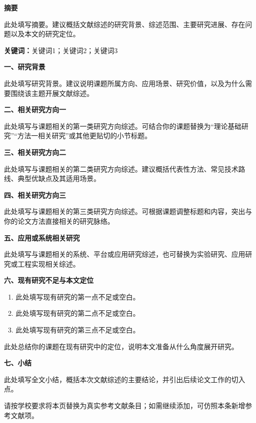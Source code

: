 \documentclass[12pt,a4paper]{ctexart}
\newcommand{\题目}{}
\newcommand{\姓名}{}
\newcommand{\学号}{}
\newcommand{\学院}{}
\newcommand{\专业}{}
\newcommand{\年级}{}
\newcommand{\校内指导教师}{}
\newcommand{\校外指导教师}{}
\newcommand{\日期年}{}
\newcommand{\日期月}{}
\newcommand{\日期日}{}
\newcommand{\摘要内容}{此处填写摘要。建议概括文献综述的研究背景、综述范围、主要研究进展、存在问题以及本文的研究定位。}
\newcommand{\关键词内容}{关键词1；关键词2；关键词3}
\newcommand{\研究背景内容}{此处填写研究背景。建议说明课题所属方向、应用场景、研究价值，以及为什么需要围绕该主题开展文献综述。}
\newcommand{\结构化处理内容}{此处填写与课题相关的第一类研究方向综述。可结合你的课题替换为“理论基础研究”“方法一相关研究”或其他更贴切的小节标题。}
\newcommand{\排序研究内容}{此处填写与课题相关的第二类研究方向综述。建议概括代表性方法、常见技术路线、典型优缺点及其适用场景。}
\newcommand{\图结构内容}{此处填写与课题相关的第三类研究方向综述。可根据课题调整标题和内容，突出与你的论文方法直接相关的研究脉络。}
\newcommand{\系统研究内容}{此处填写与课题相关的系统、平台或应用研究综述，也可替换为实验研究、应用研究或工程实现相关综述。}
\newcommand{\不足与定位条目一}{此处填写现有研究的第一点不足或空白。}
\newcommand{\不足与定位条目二}{此处填写现有研究的第二点不足或空白。}
\newcommand{\不足与定位条目三}{此处填写现有研究的第三点不足或空白。}
\newcommand{\不足与定位总结}{此处总结你的课题在现有研究中的定位，说明本文准备从什么角度展开研究。}
\newcommand{\小结内容}{此处填写全文小结，概括本次文献综述的主要结论，并引出后续论文工作的切入点。}
\newcommand{\封面字段}[3]{%
  \noindent\hspace*{2.05cm}\makebox[2.55cm][l]{\zihao{3}#1}%
  \FZUCenteredUnderline{#2}{#3}%
}
\begin{document}
\pagestyle{plain}
\setcounter{page}{1}

\begin{center}
  {\bfseries \题目}
\end{center}

\vspace{0.85cm}
\begin{center}
  {\bfseries 摘要}
\end{center}

\vspace{0.55cm}
\摘要内容\par

\vspace{0.85cm}
{\bfseries 关键词：}\关键词内容\par

\clearpage

{\bfseries 一、研究背景}\par
{}\研究背景内容\par

\vspace{0.35cm}
{\bfseries 二、相关研究方向一}\par
{}\结构化处理内容\par

\vspace{0.35cm}
{\bfseries 三、相关研究方向二}\par
{}\排序研究内容\par

\vspace{0.35cm}
{\bfseries 四、相关研究方向三}\par
{}\图结构内容\par

\vspace{0.35cm}
{\bfseries 五、应用或系统相关研究}\par
{}\系统研究内容\par

\vspace{0.35cm}
{\bfseries 六、现有研究不足与本文定位}\par
{}
\begin{enumerate}
  \item \不足与定位条目一
  \item \不足与定位条目二
  \item \不足与定位条目三
\end{enumerate}
\不足与定位总结\par

\vspace{0.35cm}
{\bfseries 七、小结}\par
{}\小结内容\par

\clearpage
\begingroup
\renewcommand{\refname}{参考文献}
\raggedright
\begin{thebibliography}{99}
\setlength{\itemsep}{0.12em}
\setlength{\parskip}{0pt}
\setlength{\parsep}{0pt}
\setlength{\topsep}{0pt}
\setlength{\partopsep}{0pt}
请按学校要求将本页替换为真实参考文献条目；如需继续添加，可仿照本条新增参考文献项。
\end{thebibliography}
\endgroup
\end{document}
